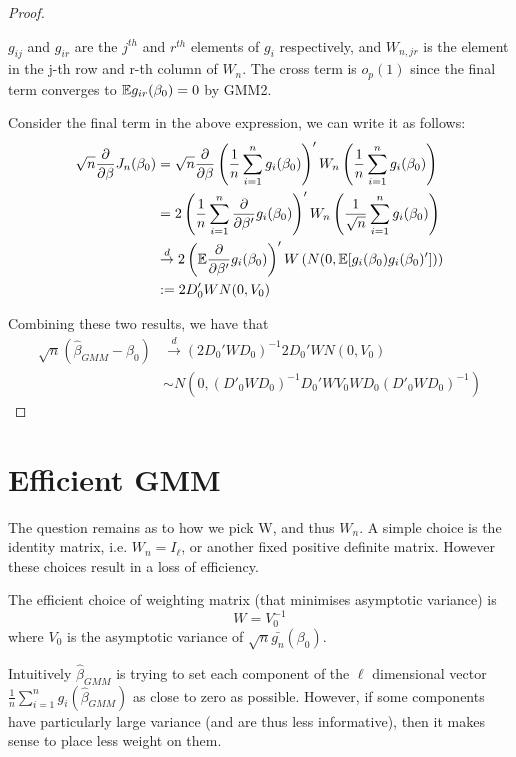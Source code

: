 \documentclass[DIV=14,titlepage=false]{scrreprt}
\begin{document}
\begin{proof}
\begin{enumerate}
$g_{ij}$ and $g_{ir}$ are the $j^{th}$ and $r^{th}$ elements of $g_i$ respectively, and $W_{n,jr}$  is the element in the j-th row and r-th column of $W_n$. The cross term is $o_p(1)$ since the final term converges to $\mathbb{E} g_{ir}(\beta_0) = 0$ by GMM2.


        Consider the final term in the above expression, we can write it as follows:
        \begin{align*}
            \sqrt{n}\frac{\partial}{\partial \beta}J_n(\beta_0) &= \sqrt{n}\frac{\partial}{\partial \beta}\left(\frac{1}{n}\sum_{i=1}^{n}g_i(\beta_0)\right)' W_n \left(\frac{1}{n}\sum_{i=1}^{n}g_i(\beta_0)\right)\\
            &= 2\left(\frac{1}{n}\sum_{i=1}^{n}\frac{\partial}{\partial \beta'}g_i(\beta_0)\right)' W_n \left(\frac{1}{\sqrt{n}}\sum_{i=1}^{n}g_i(\beta_0)\right)\\
            &\overset{d}{\to} 2\left(\mathbb{E} \frac{\partial}{\partial \beta'}g_i(\beta_0)\right)' W \left(N(0,\mathbb{E}[g_i(\beta_0)g_i(\beta_0)'])\right)\\
            &:= 2D_0'WN(0,V_0)
     \end{align*}
    \end{enumerate}

Combining these two results, we have that 
\begin{align*}
    \sqrt{n}(\hat\beta_{GMM}-\beta_0) &\overset{d}{\to} (2D_0'WD_0)^{-1}2D_0'WN(0,V_0)\\
    &\sim     N(0,(D'_0WD_0)^{-1}D_0'WV_0WD_0(D'_0WD_0)^{-1})
\end{align*}
\end{proof}

\section{Efficient GMM}
The question remains as to how we pick W, and thus $W_n$. A simple choice is the identity matrix, i.e. $W_n = I_{\ell}$, or another fixed positive definite matrix. However these choices result in a loss of efficiency. 
\begin{theorem}
    The efficient choice of weighting matrix (that minimises asymptotic variance) is \[ W= V_0^{-1}\] where $V_0$ is the asymptotic variance of $\sqrt{n}\bar{g_n}(\beta_0)$.
\end{theorem}
Intuitively $\hat\beta_{GMM}$ is trying to set each component of the $\ell$ dimensional vector $\frac{1}{n}\sum_{i=1}^{n}g_i(\hat\beta_{GMM})$ as close to zero as possible. However, if some components have particularly large variance (and are thus less informative), then it makes sense to place less weight on them.
\end{document}
